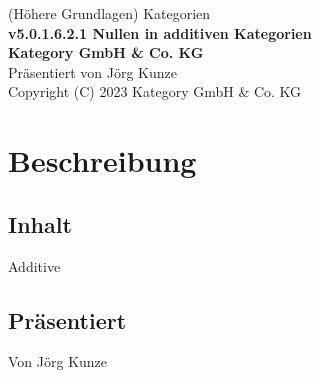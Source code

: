 \documentclass[a4paper]{amsart}
\theoremstyle{definition}
\begin{document}
\begin{titlepage}
\centering
{\huge
(Höhere Grundlagen) Kategorien\\[1cm]
\textbf{v5.0.1.6.2.1 Nullen in additiven Kategorien}
}\\[1cm]

\textbf{Kategory GmbH \& Co. KG}\\
Präsentiert von Jörg Kunze\\
Copyright (C) 2023 Kategory GmbH \& Co. KG

\end{titlepage}

%

\newpage

\section*{Beschreibung}

\subsection*{Inhalt}
Additive 

\subsection*{Präsentiert}
Von Jörg Kunze
\end{document}

